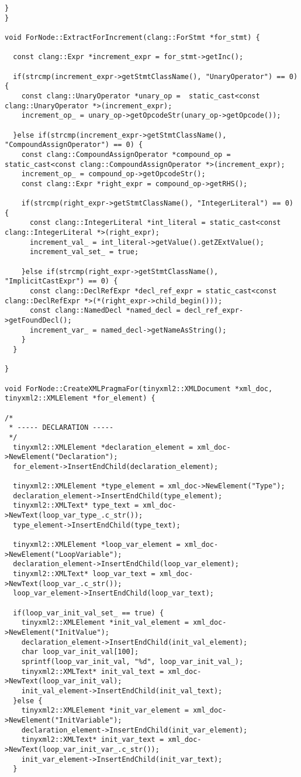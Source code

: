 \documentclass[a4paper,10pt,twoside]{book}
\begin{document}
\begin{lstlisting}[language=CCC, caption=pragma\_handler/ForNode.cpp]
  }
}

void ForNode::ExtractForIncrement(clang::ForStmt *for_stmt) {
  
  const clang::Expr *increment_expr = for_stmt->getInc();

  if(strcmp(increment_expr->getStmtClassName(), "UnaryOperator") == 0) {
    const clang::UnaryOperator *unary_op =  static_cast<const clang::UnaryOperator *>(increment_expr);
    increment_op_ = unary_op->getOpcodeStr(unary_op->getOpcode());

  }else if(strcmp(increment_expr->getStmtClassName(), "CompoundAssignOperator") == 0) {
    const clang::CompoundAssignOperator *compound_op = static_cast<const clang::CompoundAssignOperator *>(increment_expr);
    increment_op_ = compound_op->getOpcodeStr();
    const clang::Expr *right_expr = compound_op->getRHS();

    if(strcmp(right_expr->getStmtClassName(), "IntegerLiteral") == 0) {
      const clang::IntegerLiteral *int_literal = static_cast<const clang::IntegerLiteral *>(right_expr);
      increment_val_ = int_literal->getValue().getZExtValue();
      increment_val_set_ = true;

    }else if(strcmp(right_expr->getStmtClassName(), "ImplicitCastExpr") == 0) {
      const clang::DeclRefExpr *decl_ref_expr = static_cast<const clang::DeclRefExpr *>(*(right_expr->child_begin()));
      const clang::NamedDecl *named_decl = decl_ref_expr->getFoundDecl();
      increment_var_ = named_decl->getNameAsString();  
    }
  }

}

void ForNode::CreateXMLPragmaFor(tinyxml2::XMLDocument *xml_doc, tinyxml2::XMLElement *for_element) {

/*
 * ----- DECLARATION -----
 */ 
  tinyxml2::XMLElement *declaration_element = xml_doc->NewElement("Declaration");
  for_element->InsertEndChild(declaration_element);

  tinyxml2::XMLElement *type_element = xml_doc->NewElement("Type");
  declaration_element->InsertEndChild(type_element);
  tinyxml2::XMLText* type_text = xml_doc->NewText(loop_var_type_.c_str());
  type_element->InsertEndChild(type_text);

  tinyxml2::XMLElement *loop_var_element = xml_doc->NewElement("LoopVariable");
  declaration_element->InsertEndChild(loop_var_element);
  tinyxml2::XMLText* loop_var_text = xml_doc->NewText(loop_var_.c_str());
  loop_var_element->InsertEndChild(loop_var_text);

  if(loop_var_init_val_set_ == true) {
    tinyxml2::XMLElement *init_val_element = xml_doc->NewElement("InitValue");
    declaration_element->InsertEndChild(init_val_element);
    char loop_var_init_val[100];
    sprintf(loop_var_init_val, "%d", loop_var_init_val_);
    tinyxml2::XMLText* init_val_text = xml_doc->NewText(loop_var_init_val);
    init_val_element->InsertEndChild(init_val_text);
  }else {
    tinyxml2::XMLElement *init_var_element = xml_doc->NewElement("InitVariable");
    declaration_element->InsertEndChild(init_var_element);
    tinyxml2::XMLText* init_var_text = xml_doc->NewText(loop_var_init_var_.c_str());
    init_var_element->InsertEndChild(init_var_text);
  }


\end{lstlisting}
\end{document}
